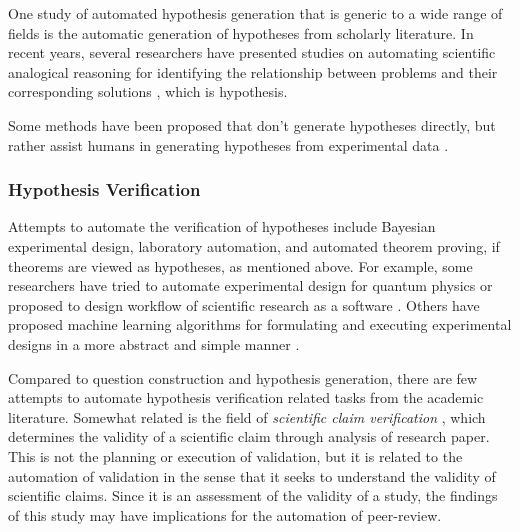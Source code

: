 
One study of automated hypothesis generation that is generic to a wide range of fields is the automatic generation of hypotheses from scholarly literature. In recent years, several researchers have presented studies on automating scientific analogical reasoning for identifying the relationship between problems and their corresponding solutions \cite{kang2022augmenting,chan2018solvent}, which is hypothesis.



Some methods have been proposed that don't generate hypotheses directly, but rather assist humans in generating hypotheses from experimental data 
 \cite{friederich2021scientific}.

\subsubsection{Hypothesis Verification}
Attempts to automate the verification of hypotheses include Bayesian experimental design, laboratory automation, and automated theorem proving, if theorems are viewed as hypotheses, as mentioned above. For example, some researchers have tried to automate experimental design for quantum physics \cite{ruiz2022digital} or proposed to design workflow of scientific research as a software \cite{goble2020fair}. Others have proposed machine learning algorithms for formulating and executing experimental designs in a more abstract and simple manner \cite{herrmann2022learning}. 

Compared to question construction and hypothesis generation, there are few attempts to automate hypothesis verification related tasks from the academic literature. Somewhat related is the field of \textit{scientific claim verification} \cite{li2019scientific,wadden2020fact,wadden2022scifact,wadden2022multivers}, which determines the validity of a scientific claim through analysis of research paper. This is not the planning or execution of validation, but it is related to the automation of validation in the sense that it seeks to understand the validity of scientific claims. Since it is an assessment of the validity of a study, the findings of this study may have implications for the automation of peer-review.

